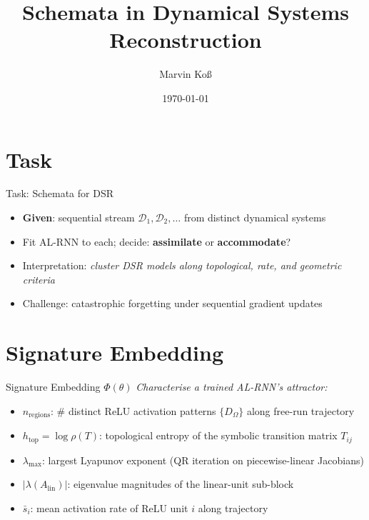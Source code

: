 \documentclass[10pt]{beamer}
\title[Schemata in DSR] %
{ %
      \textbf{Schemata in Dynamical Systems Reconstruction}
}
\author[Marvin Koß]
{      Marvin Koß
}
\institute[]
{
      Universität Heidelberg -
      Mathematik
}
\date{\today}
\begin{document}

\begin{frame}{}
\titlepage
\end{frame}

\section{Task}

\begin{frame}{Task: Schemata for DSR}
\begin{itemize}[<+->]
  \item \textbf{Given}: sequential stream $\mathcal{D}_1,\mathcal{D}_2,\ldots$ from distinct dynamical systems
  \item Fit AL-RNN to each; decide: \textbf{assimilate} or \textbf{accommodate}?
  \item Interpretation: \emph{cluster DSR models along topological, rate, and geometric criteria}
  \item Challenge: catastrophic forgetting under sequential gradient updates
\end{itemize}
\end{frame}

\section{Signature Embedding}

\begin{frame}{Signature Embedding $\Phi(\theta)$}
\textit{Characterise a trained AL-RNN's attractor:}
\begin{itemize}[<+->]
  \item $n_\mathrm{regions}$: \# distinct ReLU activation patterns $\{D_\Omega\}$ along free-run trajectory
  \item $h_\mathrm{top} = \log\rho(T)$: topological entropy of the symbolic transition matrix $T_{ij}$
  \item $\lambda_\mathrm{max}$: largest Lyapunov exponent (QR iteration on piecewise-linear Jacobians)
  \item $|\lambda(A_\mathrm{lin})|$: eigenvalue magnitudes of the linear-unit sub-block
  \item $\bar{s}_i$: mean activation rate of ReLU unit $i$ along trajectory
\end{itemize}
\end{frame}
\end{document}
